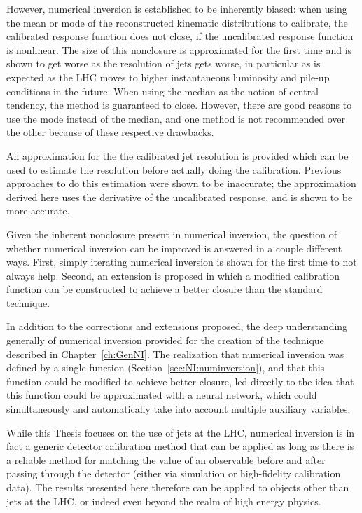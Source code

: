 However, numerical inversion is established to be inherently biased: when using the mean or mode of the reconstructed kinematic distributions to calibrate, the calibrated response function does not close, if the uncalibrated response function is nonlinear.
The size of this nonclosure is approximated for the first time and is shown to get worse as the resolution of jets gets worse, in particular as is expected as the LHC moves to higher instantaneous luminosity and pile-up conditions in the future.
When using the median as the notion of central tendency, the method is guaranteed to close.
However, there are good reasons to use the mode instead of the median, and one method is not recommended over the other because of these respective drawbacks.

An approximation for the the calibrated jet resolution is provided which can be used to estimate the resolution before actually doing the calibration.
Previous approaches to do this estimation were shown to be inaccurate; the approximation derived here uses the derivative of the uncalibrated response, and is shown to be more accurate.

Given the inherent nonclosure present in numerical inversion, the question of whether numerical inversion can be improved is answered in a couple different ways. 
First, simply iterating numerical inversion is shown for the first time to not always help.
Second, an extension is proposed in which a modified calibration function can be constructed to achieve a better closure than the standard technique.

In addition to the corrections and extensions proposed, the deep understanding generally of numerical inversion provided for the creation of the technique described in Chapter~\ref{ch:GenNI}.
The realization that numerical inversion was defined by a single function (Section~\ref{sec:NI:numinversion}), and that this function could be modified to achieve better closure, led directly to the idea that this function could be approximated with a neural network, which could simultaneously and automatically take into account multiple auxiliary variables.

While this Thesis focuses on the use of jets at the LHC, numerical inversion is in fact a generic detector calibration method that can be applied as long as there is a reliable method for matching the value of an observable before and after passing through the detector (either via simulation or high-fidelity calibration data).
The results presented here therefore can be applied to objects other than jets at the LHC, or indeed even beyond the realm of high energy physics.

\clearpage
\newpage
